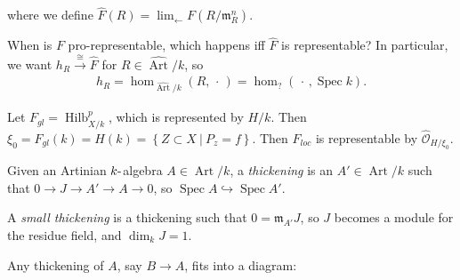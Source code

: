 where we define
\(\widehat{F}(R) = \lim_{\leftarrow} F(R/{\mathfrak{m}}_R^n)\).

\begin{description}
\tightlist
\item[Question]
When is \(F\) pro-representable, which happens iff \(\widehat{F}\) is
representable? In particular, we want
\(h_R \xrightarrow{\cong} \widehat{F}\) for
\(R\in \widehat{\operatorname{Art}}/k\), so
\begin{align*}
  h_R = \hom_{\widehat{\operatorname{Art}}/k}(R, {\,\cdot\,}) = \hom_{?}({\,\cdot\,}, \operatorname{Spec}k)
  .\end{align*}
\item[Example]
Let \(F_{gl} = \operatorname{Hilb}_{X/k}^p\), which is represented by
\(H/k\). Then
\(\xi_0 = F_{gl}(k) = H(k) = \left\{{Z\subset X {~\mathrel{\Big|}~}P_z = f}\right\}\).
Then \(F_{loc}\) is representable by
\(\widehat{{\mathcal{O}}}_{H/\xi_0}\).
\item[Definition (Thickening)]
Given an Artinian \(k{\hbox{-}}\)algebra \(A \in \operatorname{Art}/k\),
a \emph{thickening} is an \(A' \in \operatorname{Art}/k\) such that
\(0 \to J \to A' \to A \to 0\), so
\(\operatorname{Spec}A \hookrightarrow\operatorname{Spec}A'\).
\item[Definition (Small Thickening)]
A \emph{small thickening} is a thickening such that
\(0 = {\mathfrak{m}}_{A'} J\), so \(J\) becomes a module for the residue
field, and \(\dim_k J = 1\).
\item[Lemma]
Any thickening of \(A\), say \(B\to A\), fits into a diagram:
\end{description}

